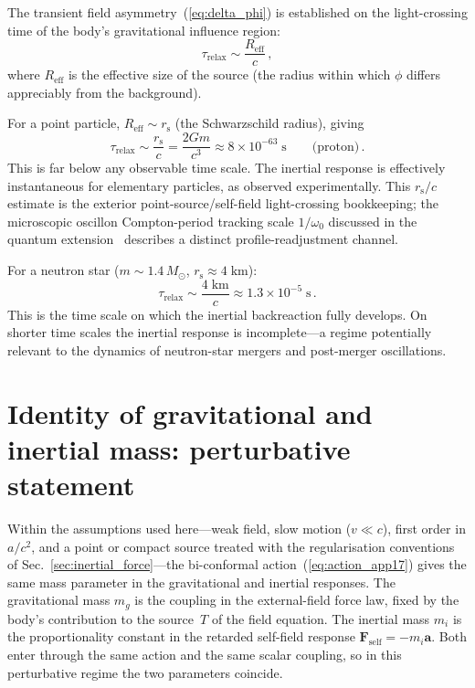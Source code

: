 \documentclass[11pt]{article}
\newcommand{\rs}{r_{\mathrm{s}}}
\begin{document}
The transient field asymmetry~(\ref{eq:delta_phi}) is
established on the light-crossing time of the body's
gravitational influence region:
\begin{equation}\label{eq:tau}
  \tau_{\mathrm{relax}} \sim \frac{R_{\mathrm{eff}}}{c}\,,
\end{equation}
where $R_{\mathrm{eff}}$ is the effective size of the
source (the radius within which $\phi$ differs
appreciably from the background).

For a point particle, $R_{\mathrm{eff}} \sim \rs$
(the Schwarzschild radius), giving
\begin{equation}\label{eq:tau_particle}
  \tau_{\mathrm{relax}} \sim \frac{\rs}{c}
  = \frac{2Gm}{c^3}
  \approx 8\times 10^{-63}\;\mathrm{s}
  \qquad\text{(proton)}\,.
\end{equation}
This is far below any observable time scale.  The
inertial response is effectively instantaneous for
elementary particles, as observed experimentally.
This $\rs/c$ estimate is the exterior point-source/self-field
light-crossing bookkeeping; the microscopic oscillon
Compton-period tracking scale $1/\omega_0$ discussed in the
quantum extension~\cite{Lotishvili2026Q} describes a distinct
profile-readjustment channel.

For a neutron star ($m \sim 1.4\,M_\odot$,
$\rs \approx 4\;\mathrm{km}$):
\begin{equation}\label{eq:tau_ns}
  \tau_{\mathrm{relax}} \sim \frac{4\;\mathrm{km}}{c}
  \approx 1.3\times10^{-5}\;\mathrm{s}\,.
\end{equation}
This is the time scale on which the inertial
backreaction fully develops.  On shorter time scales
the inertial response is incomplete---a regime
potentially relevant to the dynamics of neutron-star
mergers and post-merger oscillations.

\section{Identity of gravitational and inertial mass:
  perturbative statement}\label{sec:equivalence}

Within the assumptions used here---weak field, slow
motion ($v\ll c$), first order in $a/c^2$, and a point
or compact source treated with the regularisation
conventions of Sec.~\ref{sec:inertial_force}---the
bi-conformal action~(\ref{eq:action_app17}) gives the
same mass parameter in the gravitational and inertial
responses.  The gravitational mass $m_g$ is the coupling
in the external-field force law, fixed by the body's
contribution to the source~$T$ of the field equation.
The inertial mass $m_i$ is the proportionality constant
in the retarded self-field response
$\mathbf{F}_{\mathrm{self}}=-m_i\mathbf{a}$.
Both enter through the same action and the same scalar
coupling, so in this perturbative regime the two
parameters coincide.
\end{document}
